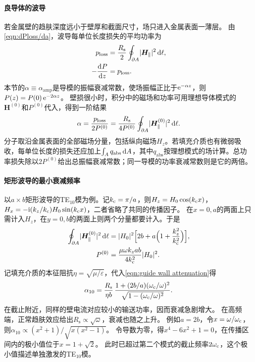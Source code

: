 \paragraph{良导体的波导}
若金属壁的趋肤深度远小于壁厚和截面尺寸，场只进入金属表面一薄层。
由\eqref{eqn:dPloss/da}，波导每单位长度损失的平均功率为
\begin{subequations}
    \label{eq:ed-waveguide-wall-loss}
    \begin{align}
        p_{\mathrm{loss}} &= \frac{R_{\mathrm s}}2\oint_{\partial A}\lvert\bm H_\parallel\rvert^2\mathop{}\!\mathrm{d}\ell,\\
        -\frac{\mathop{}\!\mathrm{d}^{}P}{\mathrm{d}{z}^{}} &= p_{\mathrm{loss}}.
    \end{align}
\end{subequations}
本节的$\alpha \equiv \alpha_{\mathrm{amp}}$是导模的振幅衰减常数，使场振幅正比于$\mathop{}\!\mathrm{e}^{-\alpha z}$，则$P(z) = P(0)\mathop{}\!\mathrm{e}^{-2\alpha z}$。
壁损很小时，积分中的磁场和功率可用理想导体模式的$\bm H^{(0)}$和$P^{(0)}$代入，得到一阶结果
\begin{equation}
    \label{eqn:guide wall attenuation}
    \alpha = \frac{p_{\mathrm{loss}}}{2P^{(0)}}
    = \frac{R_{\mathrm s}}{4P^{(0)}}\oint_{\partial A}\lvert\bm H^{(0)}_\parallel\rvert^2\mathop{}\!\mathrm{d}\ell .
\end{equation}
分子取沿金属表面的全部磁场分量，包括纵向磁场$H_z$。若填充介质也有微弱吸收，每单位长度的损失还应加上$\textstyle \int_A q_{\mathrm{abs}}\mathop{}\!\mathrm{d} A$，其中$q_{\mathrm{abs}}$按理想模式的场计算。总功率损失除以$2P^{(0)}$给出总振幅衰减常数；同一导模的功率衰减常数则是它的两倍。

\paragraph{矩形波导的最小衰减频率}
以$a \times b$矩形波导的TE$_{10}$模为例。记$k_\mathrm c = \pi/a$，则$H_z = H_0\cos(k_\mathrm c x)$，
$H_x = -\mathrm{i}(k_z/k_\mathrm c)H_0\sin(k_\mathrm c x)$，二者省略了共同的传播因子。
在$x = 0,a$的两面上只需计入$H_z$，在$y = 0,b$的两面上则两个分量都要计入。于是
\begin{align*}
    \oint_{\partial A}\lvert\bm H^{(0)}_\parallel\rvert^2\mathop{}\!\mathrm{d}\ell
       &= \lvert H_0\rvert^2\Bigl[2b + a\Bigl(1 + \frac{k_z^2}{k_\mathrm c^2}\Bigr)\Bigr],\\
    P^{(0)} &= \frac{\mu\omega k_z ab}{4k_\mathrm c^2}\lvert H_0\rvert^2.
\end{align*}
记填充介质的本征阻抗$\eta = \sqrt{\mu/\varepsilon}$，代入\eqref{eqn:guide wall attenuation}得
\begin{equation}
    \alpha_{10} = \frac{R_{\mathrm s}}{\eta b}\,
    \frac{1 + (2b/a)(\omega_\mathrm c/\omega)^2}{\sqrt{1 - (\omega_\mathrm c/\omega)^2}}.
\end{equation}
在截止附近，同样的壁电流对应较小的输送功率，因而衰减急剧增大。
在高频端，正常趋肤效应给出$R_{\mathrm s} \propto \sqrt\omega$，衰减也随之上升。
例如$a = 2b$，令$x = \omega/\omega_\mathrm c$，则$\alpha_{10} \propto (x^2 + 1)/\sqrt{x(x^2 - 1)}$。
令导数为零，得$x^4 - 6x^2 + 1 = 0$，在传播区间内的极小值位于$x = 1 + \sqrt2$。
此时已超过第二个模式的截止频率$2\omega_\mathrm c$，这个极小值描述单独激发的TE$_{10}$模。

